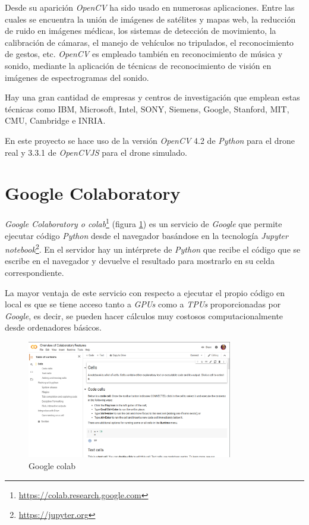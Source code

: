 Desde su aparición \textit{OpenCV} ha sido usado en numerosas aplicaciones. Entre las cuales se encuentra la unión de imágenes de satélites y mapas web, la reducción de ruido en imágenes  médicas,  los  sistemas  de  detección  de movimiento,  la  calibración  de  cámaras,  el manejo  de  vehículos  no  tripulados, el  reconocimiento  de  gestos, etc. \textit{OpenCV} es empleado también en reconocimiento de música y sonido, mediante la aplicación de técnicas de reconocimiento de visión en imágenes de espectrogramas del sonido.

Hay  una  gran  cantidad  de  empresas    y  centros  de  investigación  que  emplean  estas técnicas como IBM, Microsoft, Intel, SONY, Siemens, Google, Stanford, MIT, CMU, Cambridge e INRIA.

En este proyecto se hace uso de la versión \textit{OpenCV} 4.2 de \textit{Python} para el drone real y 3.3.1 de \textit{OpenCVJS} para el drone simulado.
\section{Google Colaboratory}
\textit{Google Colaboratory o colab}\footnote{\url{https://colab.research.google.com}} (figura \ref{fig:colab})  es un servicio de \textit{Google} que permite ejecutar código \textit{Python} desde el navegador basándose en la tecnología \textit{Jupyter notebook}\footnote{\url{https://jupyter.org}}. En el servidor hay un intérprete de \textit{Python} que recibe el código que se escribe en el navegador y devuelve el resultado para mostrarlo en su celda correspondiente.

La mayor ventaja de este servicio con respecto a ejecutar el propio código en local es que se tiene acceso tanto a \textit{GPUs} como a \textit{TPUs} proporcionadas por \textit{Google}, es decir, se pueden hacer cálculos muy costosos computacionalmente desde ordenadores básicos.

\begin{figure}[H]
  \begin{center}
    \includegraphics[width=0.8\textwidth]{figures/herramientas/colab.png}
		\caption{Google colab}
		\label{fig:colab}
		\end{center}
\end{figure}
